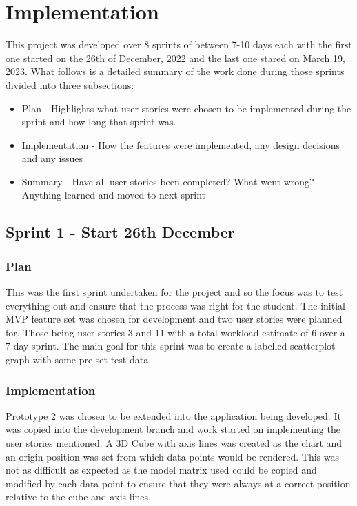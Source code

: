 
\section{Implementation}
This project was developed over 8 sprints of between 7-10 days each with the first one started on the 26th of December, 2022 and the last one stared on March 19, 2023. What follows is a detailed summary of the work done during those sprints divided into three subsections:
\begin{itemize}
    \item Plan - Highlights what user stories were chosen to be implemented during the sprint and how long that sprint was.
    \item Implementation - How the features were implemented, any design decisions and any issues
    \item Summary - Have all user stories been completed? What went wrong? Anything learned and moved to next sprint
\end{itemize}

\subsection{Sprint 1 - Start 26th December}

\subsubsection{Plan}
This was the first sprint undertaken for the project and so the focus was to test everything out and ensure that the process was right for the student. The initial MVP feature set was chosen for development and two user stories were planned for. Those being user stories 3 and 11 with a total workload estimate of 6 over a 7 day sprint.
The main goal for this sprint was to create a labelled scatterplot graph with some pre-set test data.

\subsubsection{Implementation}
Prototype 2 was chosen to be extended into the application being developed. It was copied into the development branch and work started on implementing the user stories mentioned. A 3D Cube with axis lines was created as the chart and an origin position was set from which data points would be rendered. This was not as difficult as expected as the model matrix used could be copied and modified by each data point to ensure that they were always at a correct position relative to the cube and axis lines.

